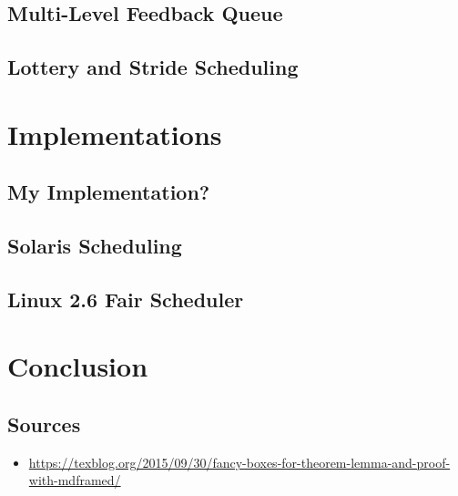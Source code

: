 \documentclass{report}
\begin{document}
\chapter{Multi-Level Feedback Queue}

\chapter{Lottery and Stride Scheduling}

\part{Implementations}

\chapter{My Implementation?}

\chapter{Solaris Scheduling}

\chapter{Linux 2.6 Fair Scheduler}



\part{Conclusion}

\chapter*{Sources}

\begin{itemize}
    \item \url{https://texblog.org/2015/09/30/fancy-boxes-for-theorem-lemma-and-proof-with-mdframed/}
\end{itemize}
\end{document}
